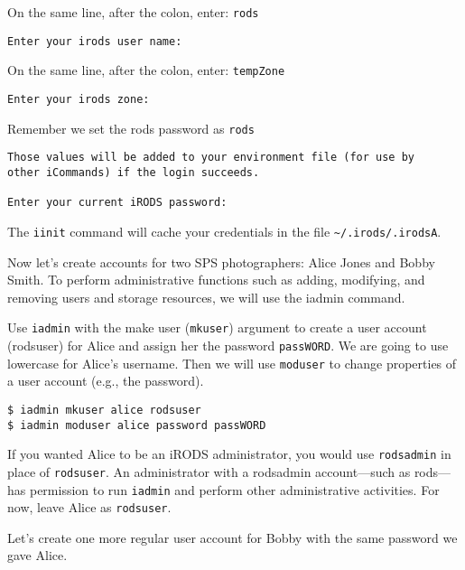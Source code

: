 \documentclass[10pt,oneside]{memoir}
\begin{document}
On the same line, after the colon, enter: \texttt{rods}

\begin{lstlisting}[basicstyle=\scriptsize\ttfamily]
Enter your irods user name:
\end{lstlisting}

On the same line, after the colon, enter: \texttt{tempZone}

\begin{lstlisting}[basicstyle=\scriptsize\ttfamily]
Enter your irods zone:
\end{lstlisting}

Remember we set the rods password as \texttt{rods}

\begin{lstlisting}[basicstyle=\scriptsize\ttfamily]
Those values will be added to your environment file (for use by
other iCommands) if the login succeeds.

Enter your current iRODS password:
\end{lstlisting}



The \texttt{iinit} command will cache your credentials in the file \texttt{\textasciitilde/.irods/.irodsA}.



Now let's create accounts for two SPS photographers: Alice Jones and Bobby Smith. To perform administrative functions such as adding, modifying, and removing users and storage resources, we will use the iadmin command.

Use \texttt{iadmin} with the make user (\texttt{mkuser}) argument to create a user account (rodsuser) for Alice and assign her the password \texttt{passWORD}. We are going to use lowercase for Alice's username. Then we will use \texttt{moduser} to change properties of a user account (e.g., the password).

\begin{lstlisting}
$ iadmin mkuser alice rodsuser
$ iadmin moduser alice password passWORD
\end{lstlisting}

If you wanted Alice to be an iRODS administrator, you would use \texttt{rodsadmin} in place of \texttt{rodsuser}. An administrator with a rodsadmin account---such as rods---has permission to run \texttt{iadmin} and perform other administrative activities. For now, leave Alice as \texttt{rodsuser}.

Let's create one more regular user account for Bobby with the same password we gave Alice.
\end{document}
